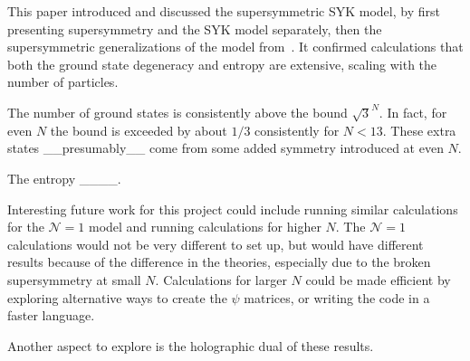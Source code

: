\documentclass[12pt]{article} %
\renewcommand{\cal}{\mathcal}
\begin{document}
This paper introduced and discussed the supersymmetric SYK model, by first presenting supersymmetry and the SYK model separately, then the supersymmetric generalizations of the model from~\cite{fu16}. It confirmed calculations that both the ground state degeneracy and entropy are extensive, scaling with the number of particles. 

The number of ground states is consistently above the bound $\sqrt{3}^N$. In fact, for even $N$ the bound is exceeded by about $1/3$ consistently for $N<13$. These extra states \_\_presumably\_\_ come from some added symmetry introduced at even $N$.

The entropy \_\_\_\_.

Interesting future work for this project could include running similar calculations for the $\cal N=1$ model and running calculations for higher $N$. The $\cal N=1$ calculations would not be very different to set up, but would have different results because of the difference in the theories, especially due to the broken supersymmetry at small $N$. Calculations for larger $N$ could be made efficient by exploring alternative ways to create the $\psi$ matrices, or writing the code in a faster language.

Another aspect to explore is the holographic dual of these results.

\printbibliography
\end{document}
